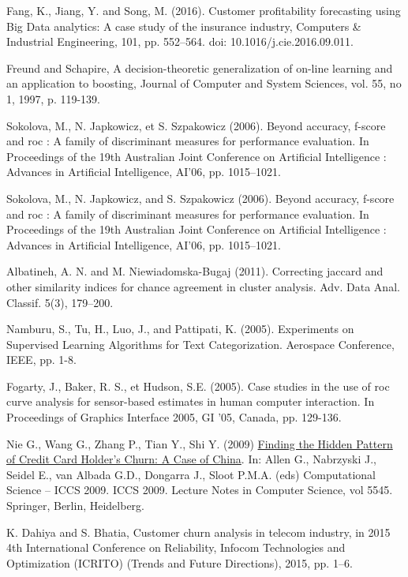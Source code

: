 \documentclass[LaM,binding=0.6cm, english]{sapthesis}
\begin{document}
\begin{thebibliography}{9}
Fang, K., Jiang, Y. and Song, M. (2016). Customer profitability forecasting using Big Data analytics: A case study of the insurance industry, Computers \& Industrial Engineering, 101, pp. 552–564. doi: 10.1016/j.cie.2016.09.011.

Freund and Schapire, A decision-theoretic generalization of on-line learning and an application to boosting, Journal of Computer and System Sciences, vol. 55, no 1, 1997, p. 119-139.

Sokolova, M., N. Japkowicz, et S. Szpakowicz (2006). Beyond accuracy, f-score and roc : A family of discriminant measures for performance evaluation. In Proceedings of the 19th Australian Joint Conference on Artificial Intelligence : Advances in Artificial Intelligence,
AI’06, pp. 1015–1021.

Sokolova, M., N. Japkowicz, and S. Szpakowicz (2006). Beyond accuracy, f-score and roc : A family of discriminant measures for performance evaluation. In Proceedings of the 19th Australian Joint Conference on Artificial Intelligence : Advances in Artificial Intelligence,
AI’06, pp. 1015–1021.

Albatineh, A. N. and M. Niewiadomska-Bugaj (2011). Correcting jaccard and other similarity indices for chance agreement in cluster analysis. Adv. Data Anal. Classif. 5(3), 179–200.

Namburu, S., Tu, H., Luo, J., and Pattipati, K. (2005). Experiments on Supervised Learning Algorithms for Text Categorization. Aerospace Conference, IEEE, pp. 1-8.

Fogarty, J., Baker, R. S., et Hudson, S.E. (2005). Case studies in the use of roc curve analysis for sensor-based estimates in human computer interaction. In Proceedings of Graphics Interface 2005, GI '05, Canada, pp. 129-136.

Nie G., Wang G., Zhang P., Tian Y., Shi Y. (2009) \href{https://doi.org/10.1007/978-3-642-01973-9_63}{Finding the Hidden Pattern of Credit Card Holder’s Churn: A Case of China}. In: Allen G., Nabrzyski J., Seidel E., van Albada G.D., Dongarra J., Sloot P.M.A. (eds) Computational Science – ICCS 2009. ICCS 2009. Lecture Notes in Computer Science, vol 5545. Springer, Berlin, Heidelberg.

K. Dahiya and S. Bhatia, Customer churn analysis in telecom industry, in 2015 4th International Conference on Reliability, Infocom Technologies and Optimization (ICRITO) (Trends and Future Directions), 2015, pp. 1–6.


\end{thebibliography}
\end{document}
